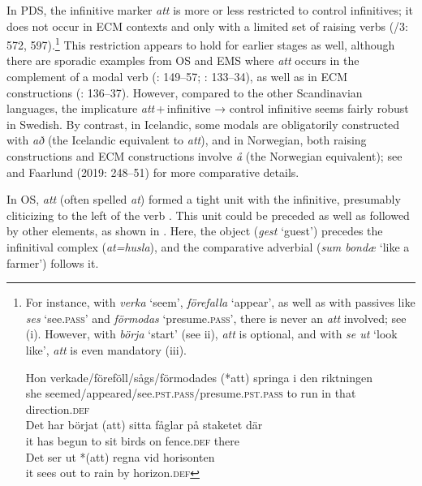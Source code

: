 \documentclass[output=paper]{langscibook}
\begin{document}
In PDS, the infinitive marker \textit{att} is more or less restricted to control infinitives; it does not occur in ECM contexts and only with a limited set of raising verbs (\citealt{TelemanEtAl1999}/3: 572, 597).\footnote{For instance, with \textit{verka} ‘seem’, \textit{förefalla} ‘appear’, as well as with passives like \textit{ses} ‘see.\textsc{pass}’ and \textit{förmodas} ‘presume.\textsc{pass}’, there is never an \textit{att} involved; see (i). However, with \textit{börja} ‘start’ (see ii), \textit{att} is optional, and with \textit{se ut} ‘look like’, \textit{att} is even mandatory (iii).

\ea \gll Hon   verkade/föreföll/sågs/förmodades     (*att)   springa   i    den   riktningen\\
        she   seemed/appeared/see\textsc{.pst.pass}/presume\textsc{.pst.pass} to     run     in   that   direction\textsc{.def}\\

\ex \gll Det   har börjat (att)   sitta   fåglar   på staketet     där\\
         it   has begun to   sit     birds   on fence\textsc{.def}   there\\
         
\ex Det   ser     ut   *(att)   regna   vid   horisonten\\
    it   sees     out to     rain     by   horizon.\textsc{def}
\z} 
This restriction appears to hold for earlier stages as well, although there are sporadic examples from OS and EMS where \textit{att} occurs in the complement of a modal verb (\citealt{Lagervall2014}: 149–57; \citealt{Kalm2016Satsekvivalenta}: 133–34), as well as in ECM constructions (\citealt{Kalm2016Satsekvivalenta}: 136–37). However, compared to the other Scandinavian languages, the implicature \textit{att}\,+\,infinitive → control infinitive seems fairly robust in Swedish. By contrast, in Icelandic, some modals are obligatorily constructed with \textit{að} (the Icelandic equivalent to \textit{att}), and in Norwegian, both raising constructions and ECM constructions involve \textit{å} (the Norwegian equivalent); see \citet[45]{Kalm2016Satsekvivalenta} and Faarlund (2019: 248–51) for more comparative details.



In OS, \textit{att} (often spelled \textit{at}) formed a tight unit with the infinitive, presumably cliticizing to the left of the verb \citep{Falk2010Studier}. This unit could be preceded as well as followed by other elements, as shown in . Here, the object (\textit{gest} ‘guest’) precedes the infinitival complex (\textit{at=husla}), and the comparative adverbial (\textit{sum bondæ} ‘like a farmer’) follows it.
\end{document}

